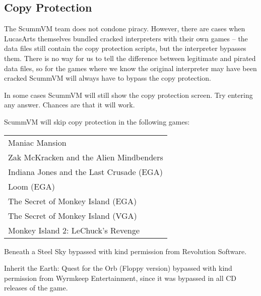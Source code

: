 


\subsection{Copy Protection}

The ScummVM team does not condone piracy. However, there are cases when
LucasArts themselves bundled cracked interpreters with their own games --
the data files still contain the copy protection scripts, but the interpreter
bypasses them. There is no way for us to tell the difference between legitimate
and pirated data files, so for the games where we know the original interpreter
may have been cracked ScummVM will always have to bypass the copy protection.

In some cases ScummVM will still show the copy protection screen. Try entering
any answer. Chances are that it will work.

ScummVM will skip copy protection in the following games:

\begin{tabular}{l}
Maniac Mansion\\
Zak McKracken and the Alien Mindbenders\\
Indiana Jones and the Last Crusade (EGA)\\
Loom (EGA)\\
The Secret of Monkey Island (EGA)\\
The Secret of Monkey Island (VGA)\\
Monkey Island 2: LeChuck's Revenge\\
\end{tabular}

Beneath a Steel Sky bypassed with kind permission from Revolution Software.

Inherit the Earth: Quest for the Orb (Floppy version) bypassed with kind
permission from Wyrmkeep Entertainment, since it was bypassed in all CD
releases of the game.
